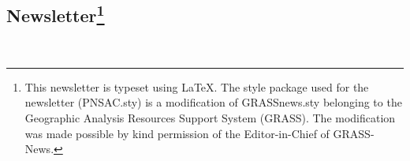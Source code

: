 \address{Paul Labranche\\
Treasurer\\
}

  
\subsection{Newsletter\protect\footnote{This newsletter is typeset using
    \LaTeX.  The style package used for the newsletter (PNSAC.sty) is
    a modification of GRASSnews.sty belonging to the Geographic
    Analysis Resources Support System (GRASS). The modification was
    made possible by kind permission of the Editor-in-Chief of
    GRASS-News.}}

\small\address{Editor: Roger Button\\
\small{}}

\address{Typesetter: Drew Hodge}









\scriptsize\address{PNSAC\\
P.O.Box 44005\\
Ottawa, ON\\
K1K 4P8}\\

